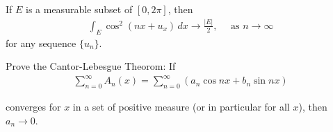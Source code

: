 \documentclass[UTF8,a4paper,10pt]{article}
\begin{document}
\begin{Problem}[]{}
  If \(E\) is a measurable subset of \([0,2\pi]\), then
  \begin{align*}
    \int_{E} \cos^2(nx + u_{x}) \,dx\to\frac{|E|}{2},\quad \text{ as }n\to \infty
  \end{align*}
  for any sequence \(\{u_n\}\).
\end{Problem}



\begin{Problem}[]{}
  Prove the Cantor-Lebesgue Theorom: If
  \begin{align*}
    \sum_{n=0}^{\infty}A_n(x) = \sum_{n=0}^{\infty}(a_n \cos nx +b_n \sin nx)
  \end{align*}

  converges for \(x\) in a set of positive measure (or in particular for all \(x\)), then \(a_n\to 0\).
\end{Problem}
\end{document}
